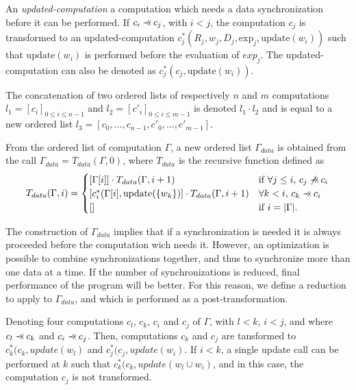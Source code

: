 \begin{mydef}
An \textit{updated-computation} a computation which needs a data synchronization before it can be performed. If $c_i \pprec c_j$, with $i<j$, the computation $c_j$ is transformed to an updated-computation $c^*_j(R_j,w_j,D_j,\text{exp}_j,\text{update}(w_i))$ such that $\text{update}(w_i)$ is performed before the evaluation of $exp_j$. The updated-computation can also be denoted as $c^*_j(c_j,\text{update}(w_i))$.
\end{mydef}

\begin{mydef}
The concatenation of two ordered lists of respectively $n$ and $m$ computations $l_1=[c_i]_{0 \leq i \leq n-1}$ and $l_2=[c'_i]_{0 \leq i \leq m-1}$ is denoted $l_1 \cdot l_2$ and is equal to a new ordered list $l_3=[c_0,\dots,c_{n-1},c'_0,\dots,c'_{m-1}]$.
\end{mydef}

\begin{mydef}
From the ordered list of computation $\Gamma$, a new ordered list $\Gamma_{data}$ is obtained from the call $\Gamma_{data} = T_{data}(\Gamma,0)$, where $T_{data}$ is the recursive function defined as
\begin{equation*}
T_{data}(\Gamma,i) = 
\begin{cases} 	[\Gamma[i]] \cdot T_{data}(\Gamma,i+1) & \mbox{if }\forall j\leq i\mbox{, } c_j \not\pprec c_i\\
				[c^*_i(\Gamma[i],\text{update}(\{w_k\})] \cdot T_{data}(\Gamma,i+1) & \forall k < i\mbox{, }c_k \pprec c_i\\
				[] & \mbox{if }i=|\Gamma|.
\end{cases}
\end{equation*}
\end{mydef}

The construction of $\Gamma_{data}$ implies that if a synchronization is needed it is always proceeded before the computation wich needs it. However, an optimization is possible to combine synchronizations together, and thus to synchronize more than one data at a time. If the number of synchronizations is reduced, final performance of the program will be better. For this reason, we define a reduction to apply to $\Gamma_{data}$, and which is performed as a post-transformation.

\begin{myprop}
Denoting four computations $c_l$, $c_k$, $c_i$ and $c_j$ of $\Gamma$, with $l<k$, $i<j$, and where $c_l \pprec c_k$ and $c_i \pprec c_j$. Then, computations $c_k$ and $c_j$ are tansformed to $c^*_k(c_k,update(w_l)$ and $c^*_j(c_j,update(w_i)$. If $i<k$, a single update call can be performed at $k$ such that $c^*_k(c_k,update(w_l\cup w_i)$, and in this case, the computation $c_j$ is not transformed.
\end{myprop}

